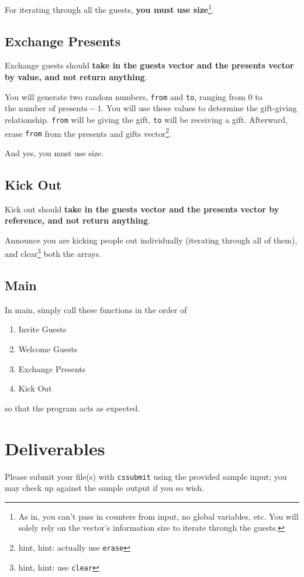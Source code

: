 \documentclass[12pt]{article}
\newcommand{\shellcmd}[1]{\texttt{\colorbox{gray!30}{#1}}}
\begin{document}
For iterating through all the guests, \textbf{you must use size}\footnote{As in, you can't pass in counters from input, no global variables, etc. You will solely rely on the vector's information size to iterate through the guests.}.

\subsection{Exchange Presents}
Exchange guests should \textbf{take in the guests vector and the presents vector by value, and not return anything}.

You will generate two random numbers, \shellcmd{from} and \shellcmd{to}, ranging from \num{0} to $\text{the number of presents} - 1$. You will use these values to determine the gift-giving relationship. \shellcmd{from} will be giving the gift, \shellcmd{to} will be receiving a gift. Afterward, erase \shellcmd{from} from the presents and gifts vector\footnote{hint, hint: actually use \shellcmd{erase}}.

And yes, you must use size.

\subsection{Kick Out}
Kick out should \textbf{take in the guests vector and the presents vector by reference, and not return anything}.

Announce you are kicking people out individually (iterating through all of them), and clear\footnote{hint, hint: use \shellcmd{clear}} both the arrays.

\subsection{Main}
In main, simply call these functions in the order of

\begin{enumerate}
    \item Invite Guests
    \item Welcome Guests
    \item Exchange Presents
    \item Kick Out
\end{enumerate}

\noindent so that the program acts as expected.

\section{Deliverables}
Please submit your file(s) with \shellcmd{cssubmit} using the provided sample input; you may check up against the sample output if you so wish.
\end{document}
